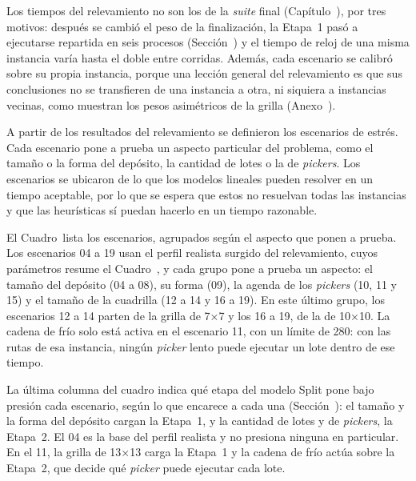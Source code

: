 Los tiempos del relevamiento no son los de la {\em suite} final
(Capítulo~\in[Capitulo_6]), por tres motivos: después se cambió el peso de
la finalización, la Etapa~1 pasó a ejecutarse repartida en seis procesos
(Sección~) y el tiempo de reloj de una misma instancia
varía hasta el doble entre corridas. Además, cada escenario se calibró sobre
su propia instancia, porque una lección general del relevamiento es que sus
conclusiones no se transfieren de una instancia a otra, ni siquiera a
instancias vecinas, como muestran los pesos asimétricos de la grilla
(Anexo~).

\stopsubsection

\startsubsection[title={Escenarios de estrés}, reference=sec:escenarios_estres]

A partir de los resultados del relevamiento se definieron los escenarios de
estrés. Cada escenario
pone a prueba un aspecto particular del problema, como el tamaño o la forma
del depósito, la cantidad de lotes o la de {\em pickers}. Los escenarios se
ubicaron  de lo que los modelos lineales pueden
resolver en un tiempo aceptable, por lo que se espera que estos no resuelvan
todas las instancias y que las heurísticas sí puedan hacerlo en un tiempo
razonable.

El Cuadro~ lista los escenarios, agrupados según el
aspecto que ponen a prueba. Los escenarios 04 a 19 usan el perfil realista
surgido del relevamiento, cuyos parámetros resume el
Cuadro~, y cada grupo pone a prueba un aspecto: el
tamaño del depósito (04 a 08), su forma (09), la agenda de los {\em pickers}
(10, 11 y 15) y el tamaño de la cuadrilla (12 a 14 y 16 a 19). En este
último grupo, los escenarios 12 a 14 parten de la grilla de 7×7 y los 16 a
19, de la de 10×10. La cadena de
frío solo está activa en el escenario 11, con un límite de 280: con las rutas
de esa instancia, ningún {\em picker} lento puede ejecutar un lote dentro de
ese tiempo.

La última columna del cuadro indica qué etapa del modelo Split pone bajo
presión cada escenario, según lo que encarece a cada una
(Sección~): el tamaño y la forma del depósito cargan la
Etapa~1, y la cantidad de lotes y de {\em pickers}, la Etapa~2. El 04 es la
base del perfil realista y no presiona ninguna en particular. En el 11, la
grilla de 13×13 carga la Etapa~1 y la cadena de frío actúa sobre la
Etapa~2, que decide qué {\em picker} puede ejecutar cada lote.

